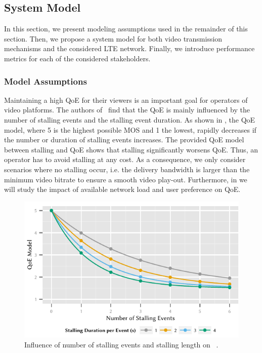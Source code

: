 \subsection{System Model}\label{sec:application:lte_video:system_model}
In this section, we present modeling assumptions used in the remainder of this section.
Then, we propose a system model for both video transmission mechanisms and the considered \gls{LTE} network.
Finally, we introduce performance metrics for each of the considered stakeholders.

\subsubsection*{Model Assumptions}\label{sec:application:lte_video:system_model:model_assumptions}
Maintaining a high \gls{QoE} for their viewers is an important goal for operators of video platforms.
The authors of~\cite{Hossfeld2012a} find that the \gls{QoE} is mainly influenced by the number of stalling events and the stalling event duration.
As shown in , the \gls{QoE} model, where 5 is the highest possible \gls{MOS} and 1 the lowest, rapidly decreases if the number or duration of stalling events increases.
The provided \gls{QoE} model between stalling and \gls{QoE} shows that stalling significantly worsens \gls{QoE}.
Thus, an operator has to avoid stalling at any cost.
As a consequence, we only consider scenarios where no stalling occur, i.e. the delivery bandwidth is larger than the minimum video bitrate to ensure a smooth video play-out.
Furthermore, in  we will study the impact of available network load and user preference on \gls{QoE}.

\begin{figure}
  \includegraphics{application/lte_video/system_model/figures/stalling2qoe}
  \caption{Influence of number of stalling events and stalling length on ~\cite{Hossfeld2012a}.}
  \label{fig:application:lte_video:system_model:stalling2qoe}
\end{figure}

